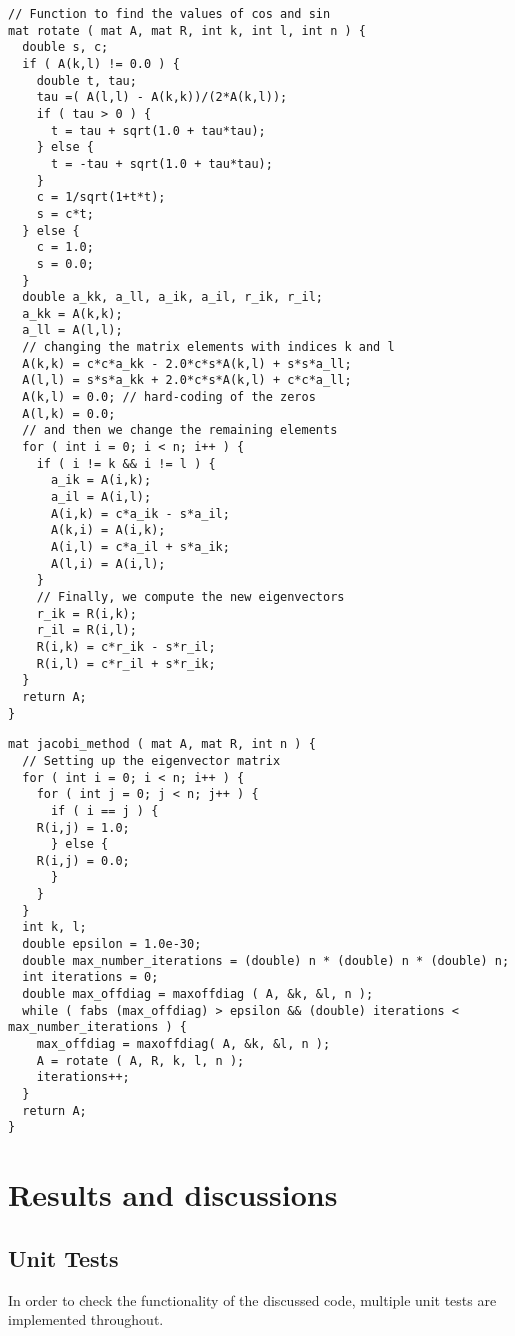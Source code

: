 \documentclass[10pt,showpacs,preprintnumbers,footinbib,amsmath,amssymb,aps,prl,twocolumn,groupedaddress,superscriptaddress,showkeys]{revtex4-1}
\begin{document}
\begin{lstlisting}
// Function to find the values of cos and sin
mat rotate ( mat A, mat R, int k, int l, int n ) {
  double s, c;
  if ( A(k,l) != 0.0 ) {
    double t, tau;
    tau =( A(l,l) - A(k,k))/(2*A(k,l));
    if ( tau > 0 ) {
      t = tau + sqrt(1.0 + tau*tau);
    } else {
      t = -tau + sqrt(1.0 + tau*tau);
    }
    c = 1/sqrt(1+t*t);
    s = c*t;
  } else {
    c = 1.0;
    s = 0.0;
  }
  double a_kk, a_ll, a_ik, a_il, r_ik, r_il;
  a_kk = A(k,k);
  a_ll = A(l,l);
  // changing the matrix elements with indices k and l
  A(k,k) = c*c*a_kk - 2.0*c*s*A(k,l) + s*s*a_ll;
  A(l,l) = s*s*a_kk + 2.0*c*s*A(k,l) + c*c*a_ll;
  A(k,l) = 0.0; // hard-coding of the zeros
  A(l,k) = 0.0;
  // and then we change the remaining elements
  for ( int i = 0; i < n; i++ ) {
    if ( i != k && i != l ) {
      a_ik = A(i,k);
      a_il = A(i,l);
      A(i,k) = c*a_ik - s*a_il;
      A(k,i) = A(i,k);
      A(i,l) = c*a_il + s*a_ik;
      A(l,i) = A(i,l);
    }
    // Finally, we compute the new eigenvectors
    r_ik = R(i,k);
    r_il = R(i,l);
    R(i,k) = c*r_ik - s*r_il;
    R(i,l) = c*r_il + s*r_ik;
  }
  return A;
}
\end{lstlisting}
\begin{lstlisting}
mat jacobi_method ( mat A, mat R, int n ) {
  // Setting up the eigenvector matrix
  for ( int i = 0; i < n; i++ ) {
    for ( int j = 0; j < n; j++ ) {
      if ( i == j ) {
	R(i,j) = 1.0;
      } else {
	R(i,j) = 0.0;
      }
    }
  }
  int k, l;
  double epsilon = 1.0e-30;
  double max_number_iterations = (double) n * (double) n * (double) n;
  int iterations = 0;
  double max_offdiag = maxoffdiag ( A, &k, &l, n );
  while ( fabs (max_offdiag) > epsilon && (double) iterations < max_number_iterations ) {
    max_offdiag = maxoffdiag( A, &k, &l, n );
    A = rotate ( A, R, k, l, n );
    iterations++;
  }
  return A;
}
\end{lstlisting}

\section{Results and discussions}
\subsection{Unit Tests}
In order to check the functionality of the discussed code, multiple unit tests are implemented throughout. 
\end{document}

